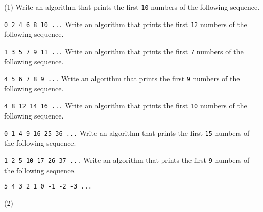 \begin{exercise}
    \begin{longtasks}(1)
        \task
        Write an algorithm that prints the first \texttt{10} numbers of the following sequence.
        
        \texttt{0 2 4 6 8 10 ...}
        \task
        Write an algorithm that prints the first \texttt{12} numbers of the following sequence.

        \texttt{1 3 5 7 9 11 ...}
        \task
        Write an algorithm that prints the first \texttt{7} numbers of the following sequence.

        \texttt{4 5 6 7 8 9 ...}
        \task
        Write an algorithm that prints the first \texttt{9} numbers of the following sequence.

        \texttt{4 8 12 14 16 ...}
        \task
        Write an algorithm that prints the first \texttt{10} numbers of the following sequence.

        \texttt{0 1 4 9 16 25 36 ...}
        \task
        Write an algorithm that prints the first \texttt{15} numbers of the following sequence.

        \texttt{1 2 5 10 17 26 37 ...}
        \task
        Write an algorithm that prints the first \texttt{9} numbers of the following sequence.

        \texttt{5 4 3 2 1 0 -1 -2 -3 ...}
    \end{longtasks}
\end{exercise}

\begin{solution}
    \begin{mltasks}(2)
        \task {}
        \task {}
        \task {}
        \task {}
        \task {}
        \task {}
        \task {}
    \end{mltasks}
\end{solution}
